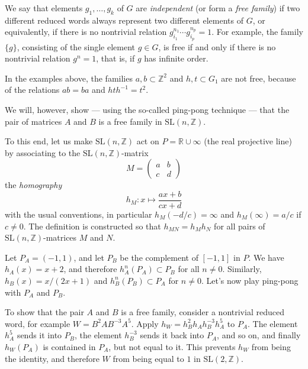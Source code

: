 \documentclass{amsart}
\def\sltwo{\ensuremath{\mathrm{SL}(n,\mathbb{Z})}}
\begin{document}
We say that elements $g_1, \dots, g_k$ of $G$ are
\textit{independent}%
(or form a \textit{free family}) if two different reduced words always
represent two different elements of $G$, or equivalently, if there is
no nontrivial relation $g_{i_1}^{n_1} \cdots g_{i_p}^{n_p} = 1$. For
example, the family $\{g\}$, consisting of the single element
$g\in G$, is free if and only if there is no nontrivial relation
$g^n = 1$, that is, if $g$ has infinite order.

In the examples above, the families ${a, b} \subset \mathbb{Z}^2$ and
${h, t} \subset G_1$ are not free, because of the relations $ab = ba$
and $hth^{-1} = t^2$.

We will, however, show --- using the so-called ping-pong technique ---
that the pair of matrices $A$ and $B$ is a free family in \sltwo.

To this end, let us make \sltwo{} act on
$P = \mathbb{R} \cup {\infty}$ (the real projective line) by
associating to the \sltwo-matrix
\[
  M = \begin{pmatrix} a & b \\ c & d \end{pmatrix}
\]
the \textit{homography}%
\[
  h_M : x \mapsto \dfrac{a x + b}{c x + d}
\]
with the usual conventions, in particular $h_M(-d/c) = \infty$ and
$h_M(\infty) = a/c$ if $c \neq 0$. The definition is constructed so that
$h_{MN} = h_M h_N$ for all pairs of $\sltwo$-matrices $M$ and $N$.

Let $P_A = (-1, 1)$, and let $P_B$ be the complement of $[-1, 1]$ in
$P$. We have $h_A(x) = x + 2$, and therefore $h_A^n(P_A) \subset P_B$
for all $n \neq 0$. Similarly, $h_B(x) = x/(2x+1)$
and $h_B^n(P_B) \subset P_A$ for $n \neq
0$.%
Let's now play ping-pong with $P_A$ and $P_B$.

To show that the pair $A$ and $B$ is a free family, consider a
nontrivial reduced word, for example $W = B^2 A B^{-3} A^5$. Apply
$h_W = h_B^2 h_A h_B^{-3} h_A^5$ to $P_A$. The element $h_A^5$ sends
it into $P_B$, the element $h_B^{-3}$ sends it back into $P_A$, and so
on, and finally $h_W(P_A)$ is contained in $P_A$, but not equal to
it. This prevents $h_W$ from being the identity, and therefore $W$
from being equal to $1$ in $\mathrm{SL}(2, \mathbb{Z})$.
\end{document}
